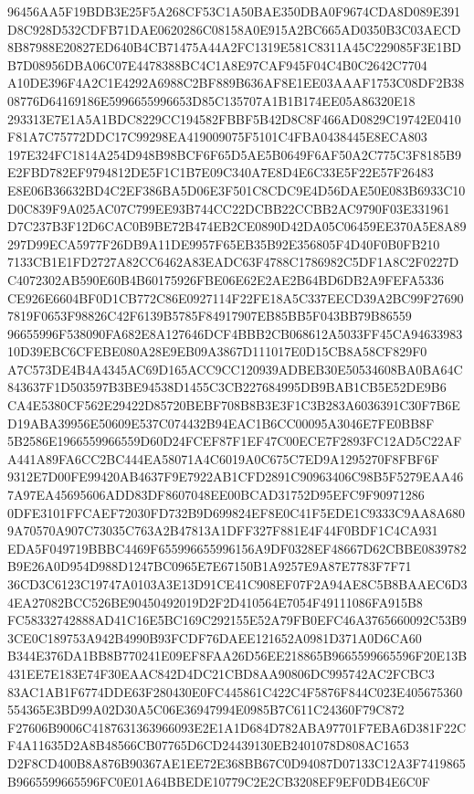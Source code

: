 \documentclass[UTF8,fontset=fandol,zihao=-4,a4paper]{ctexart}
\begin{document}
{{96456AA5F19BDB3E25F5A268CF53C1A50BAE350DBA0F9674CDA8D089E391D8C928D532CDFB71DAE0620286C08158A0E915A2BC665AD0350B3C03AECD
8B87988E20827ED640B4CB71475A44A2FC1319E581C8311A45C229085F3E1BDB7D08956DBA06C07E4478388BC4C1A8E97CAF945F04C4B0C2642C7704
A10DE396F4A2C1E4292A6988C2BF889B636AF8E1EE03AAAF1753C08DF2B3808776D64169186E5996655996653D85C135707A1B1B174EE05A86320E18
293313E7E1A5A1BDC8229CC194582FBBF5B42D8C8F466AD0829C19742E0410F81A7C75772DDC17C99298EA419009075F5101C4FBA0438445E8ECA803
197E324FC1814A254D948B98BCF6F65D5AE5B0649F6AF50A2C775C3F8185B9E2FBD782EF9794812DE5F1C1B7E09C340A7E8D4E6C33E5F22E57F26483
E8E06B36632BD4C2EF386BA5D06E3F501C8CDC9E4D56DAE50E083B6933C10D0C839F9A025AC07C799EE93B744CC22DCBB22CCBB2AC9790F03E331961
D7C237B3F12D6CAC0B9BE72B474EB2CE0890D42DA05C06459EE370A5E8A89297D99ECA5977F26DB9A11DE9957F65EB35B92E356805F4D40F0B0FB210
7133CB1E1FD2727A82CC6462A83EADC63F4788C1786982C5DF1A8C2F0227DC4072302AB590E60B4B60175926FBE06E62E2AE2B64BD6DB2A9FEFA5336
CE926E6604BF0D1CB772C86E0927114F22FE18A5C337EECD39A2BC99F276907819F0653F98826C42F6139B5785F84917907EB85BB5F043BB79B86559
96655996F538090FA682E8A127646DCF4BBB2CB068612A5033FF45CA9463398310D39EBC6CFEBE080A28E9EB09A3867D111017E0D15CB8A58CF829F0
A7C573DE4B4A4345AC69D165ACC9CC120939ADBEB30E50534608BA0BA64C843637F1D503597B3BE94538D1455C3CB227684995DB9BAB1CB5E52DE9B6
CA4E5380CF562E29422D85720BEBF708B8B3E3F1C3B283A6036391C30F7B6ED19ABA39956E50609E537C074432B94EAC1B6CC00095A3046E7FE0BB8F
5B2586E1966559966559D60D24FCEF87F1EF47C00ECE7F2893FC12AD5C22AFA441A89FA6CC2BC444EA58071A4C6019A0C675C7ED9A1295270F8FBF6F
9312E7D00FE99420AB4637F9E7922AB1CFD2891C90963406C98B5F5279EAA467A97EA45695606ADD83DF8607048EE00BCAD31752D95EFC9F90971286
0DFE3101FFCAEF72030FD732B9D699824EF8E0C41F5EDE1C9333C9AA8A6809A70570A907C73035C763A2B47813A1DFF327F881E4F44F0BDF1C4CA931
EDA5F049719BBBC4469F655996655996156A9DF0328EF48667D62CBBE0839782B9E26A0D954D988D1247BC0965E7E67150B1A9257E9A87E7783F7F71
36CD3C6123C19747A0103A3E13D91CE41C908EF07F2A94AE8C5B8BAAEC6D34EA27082BCC526BE90450492019D2F2D410564E7054F49111086FA915B8
FC58332742888AD41C16E5BC169C292155E52A79FB0EFC46A3765660092C53B93CE0C189753A942B4990B93FCDF76DAEE121652A0981D371A0D6CA60
B344E376DA1BB8B770241E09EF8FAA26D56EE218865B9665599665596F20E13B431EE7E183E74F30EAAC842D4DC21CBD8AA90806DC995742AC2FCBC3
83AC1AB1F6774DDE63F280430E0FC445861C422C4F5876F844C023E405675360554365E3BD99A02D30A5C06E36947994E0985B7C611C24360F79C872
F27606B9006C4187631363966093E2E1A1D684D782ABA97701F7EBA6D381F22CF4A11635D2A8B48566CB07765D6CD24439130EB2401078D808AC1653
D2F8CD400B8A876B90367AE1EE72E368BB67C0D94087D07133C12A3F7419865B9665599665596FC0E01A64BBEDE10779C2E2CB3208EF9EF0DB4E6C0F
}}
\end{document}
